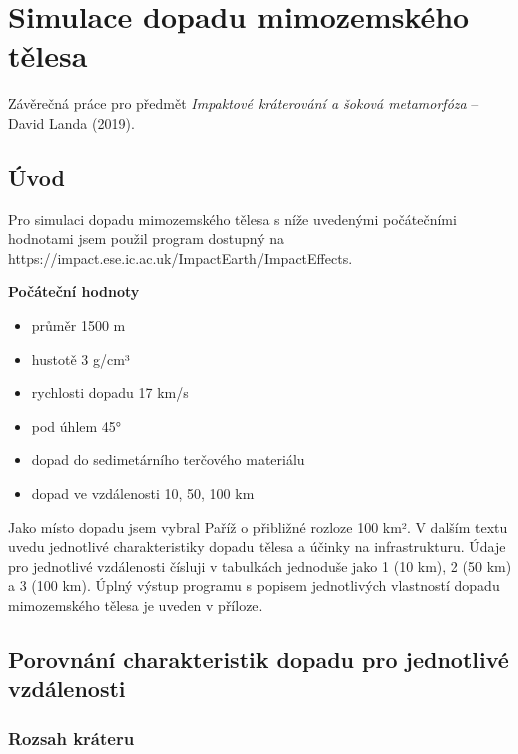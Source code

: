 \documentclass[
]{article}
\date{}
\providecommand{\tightlist}{%
  \setlength{\itemsep}{0pt}\setlength{\parskip}{0pt}}
\begin{document}
\hypertarget{simulace-dopadu-mimozemskuxe9ho-tux11blesa}{%
\section{Simulace dopadu mimozemského
tělesa}\label{simulace-dopadu-mimozemskuxe9ho-tux11blesa}}

Závěrečná práce pro předmět \emph{Impaktové kráterování a šoková
metamorfóza} -- David Landa (2019).

\hypertarget{uxfavod}{%
\subsection{Úvod}\label{uxfavod}}

Pro simulaci dopadu mimozemského tělesa s níže uvedenými počátečními
hodnotami jsem použil program dostupný na
https://impact.ese.ic.ac.uk/ImpactEarth/ImpactEffects.

\textbf{Počáteční hodnoty}

\begin{itemize}
\tightlist
\item
  průměr 1500 m
\item
  hustotě 3 g/cm³
\item
  rychlosti dopadu 17 km/s
\item
  pod úhlem 45°
\item
  dopad do sedimetárního terčového materiálu
\item
  dopad ve vzdálenosti 10, 50, 100 km
\end{itemize}

Jako místo dopadu jsem vybral Paříž o přibližné rozloze 100 km². V
dalším textu uvedu jednotlivé charakteristiky dopadu tělesa a účinky na
infrastrukturu. Údaje pro jednotlivé vzdálenosti čísluji v tabulkách
jednoduše jako 1 (10 km), 2 (50 km) a 3 (100 km). Úplný výstup programu
s popisem jednotlivých vlastností dopadu mimozemského tělesa je uveden v
příloze.

\hypertarget{porovnuxe1nuxed-charakteristik-dopadu-pro-jednotlivuxe9-vzduxe1lenosti}{%
\subsection{Porovnání charakteristik dopadu pro jednotlivé
vzdálenosti}\label{porovnuxe1nuxed-charakteristik-dopadu-pro-jednotlivuxe9-vzduxe1lenosti}}

\hypertarget{rozsah-kruxe1teru}{%
\subsubsection{Rozsah kráteru}\label{rozsah-kruxe1teru}}
\end{document}
